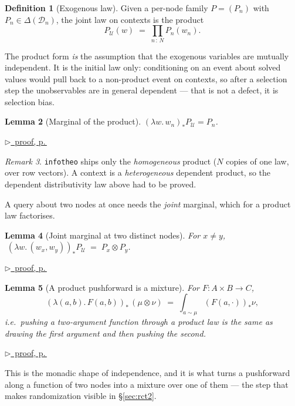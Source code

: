 \documentclass[11pt,a4paper]{article}
\theoremstyle{definition}
\newtheorem{definition}{Definition}[section]
\theoremstyle{plain}
\newtheorem{lemma}[definition]{Lemma}
\theoremstyle{remark}
\newtheorem{remark}[definition]{Remark}
\newcommand{\dom}{\mathcal{D}}
\newcommand{\Ctx}{\mathcal{U}}         %
\newcommand{\Dist}[1]{\Delta(#1)}      %
\newcommand{\push}[1]{{#1}_{*}}        %
\newcommand{\pfref}[1]{%
  \par\smallskip\noindent
  \hyperref[pf:#1]{\small$\triangleright$\ proof, p.\,\pageref{pf:#1}}\par\smallskip}
\begin{document}
\begin{definition}[Exogenous law]
Given a per-node family $P = (P_n)$ with $P_n \in \Dist{\dom_n}$, the joint
law on contexts is the product
\[
  P_\Ctx(w) \;=\; \prod_{n\,:\,N} P_n(w_n).
\]
\end{definition}

The product form \emph{is} the assumption that the exogenous variables are
mutually independent. It is the initial law only: conditioning on an event
about solved values would pull back to a non-product event on contexts, so
after a selection step the unobservables are in general dependent --- that
is not a defect, it is selection bias.

\begin{lemma}[Marginal of the product]
\label{lem:ctxmarg}
$\push{(\lambda w.\,w_n)} P_\Ctx = P_n$.
\end{lemma}

\pfref{lem:ctxmarg}

\begin{remark}
\texttt{infotheo} ships only the \emph{homogeneous} product ($N$ copies of
one law, over row vectors). A context is a \emph{heterogeneous} dependent
product, so the dependent distributivity law above had to be proved.
\end{remark}

A query about two nodes at once needs the \emph{joint} marginal, which for a
product law factorises.

\begin{lemma}[Joint marginal at two distinct nodes]
\label{lem:pairmarg}
For $x \neq y$,
$\;\push{(\lambda w.\,(w_x, w_y))} P_\Ctx \;=\; P_x \otimes P_y$.
\end{lemma}

\pfref{lem:pairmarg}

\begin{lemma}[A product pushforward is a mixture]
\label{lem:uncurry}
For $F : A \times B \to C$,
\[
  \push{(\lambda (a,b).\,F(a,b))}\,(\mu \otimes \nu)
  \;=\;
  \int_{a \sim \mu} \push{(F(a,\cdot))}\nu ,
\]
i.e.\ pushing a two-argument function through a product law is the same as
drawing the first argument and then pushing the second.
\end{lemma}

\pfref{lem:uncurry}

This is the monadic shape of independence, and it is what turns a
pushforward along a function of two nodes into a mixture over one of them
--- the step that makes randomization visible in
\S\ref{sec:rct2}.
\end{document}
